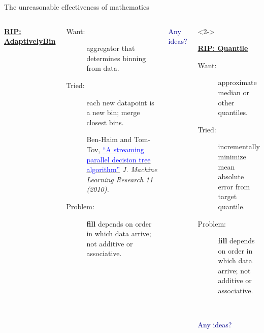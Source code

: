 \documentclass[aspectratio=169]{beamer}
\begin{document}
\begin{frame}{The unreasonable effectiveness of mathematics}
\large
\begin{columns}
\begin{center}
\bf \underline{RIP: AdaptivelyBin}
\end{center}

\begin{description}
\item[Want:] aggregator that determines binning from data.

\item[Tried:] each new datapoint is a new bin; merge closest bins.

\vspace{0.25 cm}
\begin{minipage}{\linewidth}
\scriptsize Ben-Haim and Tom-Tov, \href{http://www.jmlr.org/papers/volume11/ben-haim10a/ben-haim10a.pdf}{\textcolor{blue}{``A streaming parallel decision tree algorithm''}} {\it J. Machine Learning Research 11 (2010).}
\end{minipage}

\item[Problem:] {\ttfamily\small\textbf{fill}} depends on order in which data arrive; not additive or associative.
\end{description}

\begin{center}
\textcolor{darkblue}{Any ideas?}
\end{center}

\begin{uncoverenv}<2->
\begin{center}
\bf \underline{RIP: Quantile}
\end{center}

\begin{description}
\item[Want:] approximate median or other quantiles.

\item[Tried:] incrementally minimize mean absolute error from target quantile.

\item[Problem:] {\ttfamily\small\textbf{fill}} depends on order in which data arrive; not additive or associative.

\mbox{ }
\end{description}

\begin{center}
\textcolor{darkblue}{Any ideas?}
\end{center}
\end{uncoverenv}
\end{columns}
\end{frame}
\end{document}
